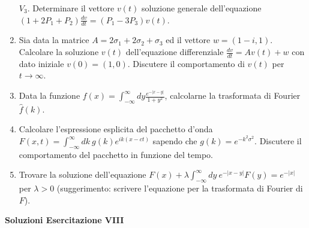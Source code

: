 \documentclass[a4paper,10pt]{article}
\begin{document}
\begin{enumerate}
$V_3$. Determinare il vettore $v(t)$ soluzione generale dell'equazione
$(1+2 P_1 + P_2) \frac{dv}{dt} = (P_1 - 3 P_3) v(t)$.
\item Sia data la matrice $A=2\sigma_1 + 2 \sigma_2 + \sigma_3$ ed il
vettore $w=(1-i,1)$. Calcolare la soluzione $v(t)$ dell'equazione differenziale
$\frac{dv}{dt} = A v(t) + w$ con dato iniziale $v(0)=(1,0)$.
Discutere il comportamento di $v(t)$ per $t \rightarrow \infty$.
\item Data la funzione 
$f(x) = \int_{-\infty}^\infty dy \frac{e^{-|x-y|}}{1+y^2}$, calcolarne la
trasformata di Fourier $\hat{f}(k)$.
\item Calcolare l'espressione esplicita del pacchetto d'onda 
$F(x,t)=\int_{-\infty}^\infty dk \ g(k) e^{i k (x - ct) }$ sapendo che
$g(k) = e^{- k^2 \sigma^2}$. Discutere il comportamento del pacchetto
in funzione del tempo.
\item Trovare la soluzione dell'equazione 
$F(x)+\lambda \int_{-\infty}^\infty dy \ e^{-|x-y|} F(y) = e^{-|x|}$ 
per $\lambda >0$
(suggerimento: scrivere l'equazione per la trasformata di Fourier
di $F$).
\end{enumerate}

\newpage


\centerline{\LARGE \bf Soluzioni Esercitazione VIII}
\vskip10pt
\end{document}

